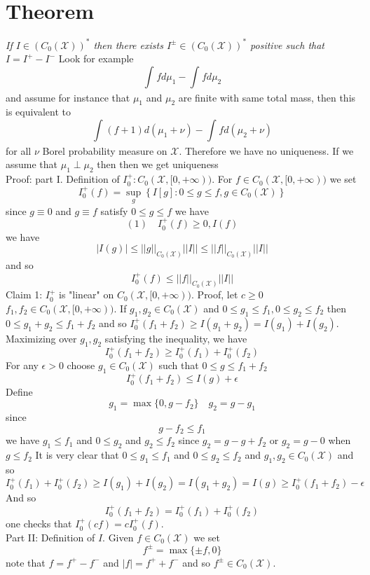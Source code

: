 \documentclass[11pt]{article}
\begin{document}
\section{Theorem}
\emph{
    If $I \in (C_0( \mathcal{X}))^{*}$ then there exists $I^{\pm} \in (C_0( \mathcal{X}))^{*}$ positive
    such that $I = I^{+} - I^{-}$
}
Look for example
\[
\int_{}^{}f d\mu_1 - \int_{}^{}f d\mu_2
\] 
and assume for instance that $\mu_1$ and $\mu_2$ are finite with same total mass, then this is equivalent to
\[
\int_{}^{}(f+1) d(\mu_1 + \nu) - \int_{}^{}fd(\mu_2 + \nu)
\] 
for all $\nu$ Borel probability measure on  $ \mathcal{X}$. Therefore we have no uniqueness.
If we assume that $\mu_1 \perp \mu_2$ then then we get uniqueness\\
Proof:  part I. Definition of $I^{+}_0 : C_0( \mathcal{X}, [0,+\infty))$.
For $f \in C_0( \mathcal{X}, [0,+\infty))$ we set
\[
    I_0^{+}(f) = \sup_{g}\left\{ I[g] : 0 \le g \le f, g \in C_0( \mathcal{X})\right\}
\] 
since $ g \equiv 0$ and $g \equiv f$ satisfy  $0 \le g \le f$ we have  
\[
    (1) \quad I_0^{+}(f) \ge 0, I(f)
\] 
we have
\[
    |I(g)| \le ||g||_{C_0( \mathcal{X})} ||I|| \le ||f||_{C_0( \mathcal{X})}||I||
\] 
and so
\[
    I^{+}_0(f) \le ||f||_{C_0( \mathcal{X})} ||I||
\] 
Claim 1: $I_0^{+}$ is "linear" on $ C_0( \mathcal{X},[0,+\infty))$.
Proof, let $c \ge 0$  $f_1,f_2 \in C_0( \mathcal{X}, [0,+\infty))$. If
$g_1, g_2 \in C_0( \mathcal{X})$ and $0 \le g_1 \le f_1, 0 \le g_2 \le f_2$ then $0 \le g_1 + g_2 \le f_1 + f_2$ and
so $I_0^{+}(f_1 + f_2) \ge I(g_1+g_2) = I(g_1) + I(g_2)$. Maximizing over $g_1,g_2$ satisfying the inequality,
we have
\[
I_0^{+}(f_1 + f_2) \ge I_0^{+}(f_1) + I_0^{+}(f_2)
\] 
For any $\epsilon > 0$ choose $g_1 \in C_0( \mathcal{X})$ such that $0 \le g \le f_1+f_2$ 
\[
    I_0^{+}(f_1 + f_2) \le I(g) + \epsilon
\] 
Define
\[
    g_1 = \max\{0, g-f_2\} \quad g_2 = g-g_1
\] 
since 
\[
g - f_2 \le f_1
\] 
we have $g_1 \le f_1$ and $0 \le g_2$
and $g_2 \le f_2$ since $g_2 = g - g +f_2$ or $g_2 = g-0$ when $g \le f_2$
It is very clear that $0 \le g_1 \le f_1$ and $0 \le g_2 \le f_2$ and  $g_1,g_2 \in C_0( \mathcal{X})$
and so
\[
I_0^{+}(f_1) + I_0^{+}(f_2) \ge I(g_1) + I(g_2) = I(g_1 + g_2) = I(g) \ge I_0^{+}(f_1 + f_2) - \epsilon
\] 
And so
\[
    I_0^{+}(f_1 + f_2) = I_0^{+}(f_1) + I_0^{+}(f_2)
\] 
one checks that $I_0^{+}(cf) = cI_0^{+}(f)$.\\
Part II:  Definition of $I$. Given  $f \in C_0 ( \mathcal{X})$ we set
\[
    f^{\pm } = \max\{ \pm f, 0\}
\] 
note that  $f = f^{+} - f^{-}$ and $|f| = f^{+} + f^{-}$ and so
$f^{\pm} \in C_0(\mathcal{X})$.
\end{document}
